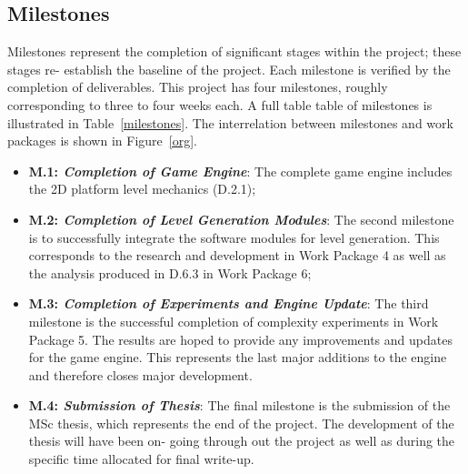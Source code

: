 \documentclass[a4paper]{article}
\begin{document}
\subsection{Milestones}

Milestones represent the completion of significant stages within the project; these stages re-
establish the baseline of the project. Each milestone is verified by the completion of deliverables.
This project has four milestones, roughly corresponding to three to four weeks each. A full table
table of milestones is illustrated in Table~\ref{milestones}. The interrelation between milestones and work packages is shown in Figure~\ref{org}.

\begin{itemize}

  \item \textbf{M.1: \textit{Completion of Game Engine}}: The complete game engine includes the 2D platform level mechanics (D.2.1);
\vspace{-3mm} 
  \item \textbf{M.2: \textit{Completion of Level Generation Modules}}: The second milestone is to successfully
  integrate the software modules for level generation. This corresponds to the research and
  development in Work Package 4 as well as the analysis produced in D.6.3 in Work Package 6;
\vspace{-3mm} 
  \item \textbf{M.3: \textit{Completion of Experiments and Engine Update}}: The third milestone is
the successful completion of complexity experiments in Work Package 5. The results are hoped to
provide any improvements and updates for the game engine. This represents the last major additions
to the engine and therefore closes major development. 
\vspace{-3mm} 
\item \textbf{M.4: \textit{Submission of Thesis}}: The final milestone is the submission of the MSc
thesis, which represents the end of the project. The development of the thesis will have been on-
going through out the project as well as during the specific time allocated for final write-up.
\vspace{-3mm} 

\end{itemize}
\end{document}
